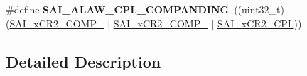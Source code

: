 \begin{DoxyCompactItemize}
\item 
\#define {\bfseries S\+A\+I\+\_\+\+A\+L\+A\+W\+\_\+C\+P\+L\+\_\+\+C\+O\+M\+P\+A\+N\+D\+I\+NG}~((uint32\+\_\+t)(\hyperlink{group___peripheral___registers___bits___definition_ga07d441ea4c041f91e4879a5b32278128}{S\+A\+I\+\_\+x\+C\+R2\+\_\+\+C\+O\+M\+P\+\_} $\vert$ \hyperlink{group___peripheral___registers___bits___definition_ga4e73ed73e3404aa41ae0edad8af036f8}{S\+A\+I\+\_\+x\+C\+R2\+\_\+\+C\+O\+M\+P\+\_} $\vert$ \hyperlink{group___peripheral___registers___bits___definition_ga3a8f6db7fd5fe5f0e264fa6c184d02e1}{S\+A\+I\+\_\+x\+C\+R2\+\_\+\+C\+PL}))\hypertarget{group___s_a_i___block___companding___mode_ga980709705d3db05df0daa17bf7cd1103}{}\label{group___s_a_i___block___companding___mode_ga980709705d3db05df0daa17bf7cd1103}

\end{DoxyCompactItemize}


\subsection{Detailed Description}
